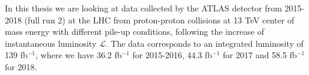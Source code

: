 In this thesis we are looking at data collected by the ATLAS detector from 2015-2018 (full run 2) at the LHC from proton-proton collisions at 13 TeV center of mass energy with different pile-up conditions, following the increase of instantaneous luminosity $\mathscr{L}$. The data corresponds to an integrated luminosity of 139 fb$^{-1}$, where we have 36.2 fb$^{-1}$ for 2015-2016, 44.3 fb$^{-1}$ for 2017 and 58.5 fb$^{-1}$ for 2018.




 





